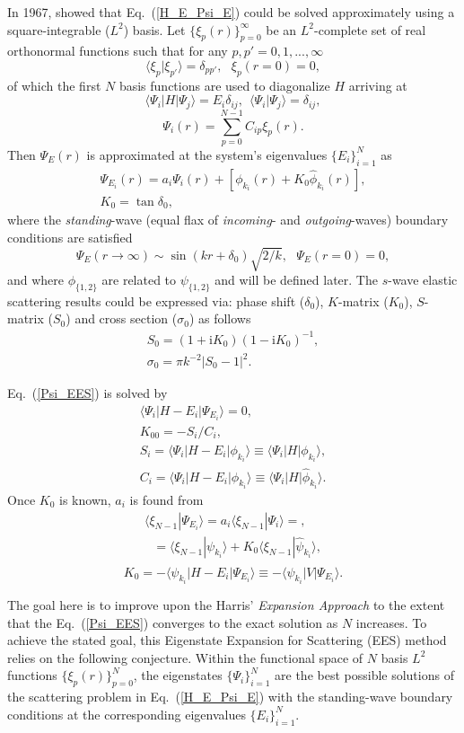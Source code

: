 \documentclass[aip
, pra
, showpacs
, aps
, twocolumn
, groupedaddress
, floatfix
]{revtex4}
\newcommand{\beq}{\begin{equation}}
\newcommand{\eeq}{\end{equation}}
\newcommand{\barr}{\begin{array}}
\newcommand{\earr}{\end{array}}
\begin{document}
In 1967, \citet{Harris67} showed that Eq.~(\ref{H_E_Psi_E}) could be solved
approximately using a square-integrable ($L^2$) basis.
Let $\{\xi_p(r)\}_{p=0}^\infty$ be an $L^2$-complete set of real orthonormal functions
such that for any $p,p'=0,1,...,\infty$
\beq
\langle \xi_p | \xi_{p'} \rangle=\delta_{pp'}, \ \ \ \xi_p(r=0)=0,
\eeq
of which the first $N$ basis functions are used to diagonalize $H$ arriving at
\beq
\langle \Psi_i |H| \Psi_j \rangle = E_i \delta_{ij} , \ \ \langle \Psi_i | \Psi_j \rangle=\delta_{ij},
\eeq
\beq
\Psi_i(r) = \sum_{p=0}^{N-1} C_{ip} \xi_p(r).
\eeq
Then $\Psi_E(r)$ is approximated at the system's eigenvalues $\{E_i\}_{i=1}^{N}$ as
\cite{Harris67}
\beq \barr{l}
\Psi_{E_i}(r) = a_i \Psi_i(r)  + [\phi_{k_i}(r)  + K_0 \widehat{\phi}_{k_i}(r)],\\
K_0 = \tan{\delta_0},
\earr \label{Psi_EES} \eeq
where the {\em standing}-wave (equal flax of {\em incoming}- and {\em outgoing}-waves) boundary conditions are satisfied
\beq
\Psi_E(r \rightarrow \infty) \sim  \sin(kr+\delta_0) \sqrt{2/k}, \ \ \ \Psi_E(r= 0)=0,
\eeq
and where $\phi_{\{1,2\}}$ are related to $\psi_{\{1,2\}}$ and will be defined later.
The $s$-wave elastic scattering results could be expressed via:
phase shift ($\delta_0$), $K$-matrix ($K_0$), $S$-matrix ($S_{0}$) and cross section ($\sigma_{0}$)
as follows
\beq \barr{l}
S_{0}=(1+\mbox{i}K_0)(1-\mbox{i}K_0)^{-1}, \\
\sigma_{0}=\pi k^{-2} |S_{0}-1|^2.
\earr \eeq


Eq.~(\ref{Psi_EES}) is solved by
\beq \barr{l}
\langle\Psi_i|H-E_i|\Psi_{E_i}\rangle=0,\\
K_{00} = - S_i / C_i, \\
S_i = \langle\Psi_i|H-E_i|  \phi_{k_i} \rangle \equiv \langle\Psi_i|H|  \phi_{k_i} \rangle, \\
C_i = \langle\Psi_i|H-E_i|  \widehat{\phi}_{k_i} \rangle \equiv \langle\Psi_i|H|  \widehat{\phi}_{k_i} \rangle.
\earr \eeq
Once $K_0$ is known, $a_i$ is found from
\beq \barr{l}
\langle \xi_{N-1} | \Psi_{E_i}\rangle
= a_i \langle \xi_{N-1}| \Psi_i \rangle = ,\\
\ \ \ =  \langle \xi_{N-1}| \psi_{k_i} \rangle
+ K_0 \langle \xi_{N-1}| \widehat{\psi}_{k_i} \rangle ,\\
\earr \eeq
\beq
K_0 = -\langle \psi_{k_i} | H - E_i | \Psi_{E_i} \rangle \equiv
-\langle \psi_{k_i} | V | \Psi_{E_i} \rangle.
\eeq


The goal here is to improve upon the Harris' {\em Expansion Approach} \cite{Harris67} to the extent that the Eq.~(\ref{Psi_EES})
converges to the exact solution as $N$ increases.
To achieve the stated goal, this Eigenstate Expansion for Scattering (EES) method relies on the following conjecture.
Within the functional space of $N$ basis $L^2$ functions  $\{\xi_p(r)\}_{p=0}^N$,
the eigenstates $\{\Psi_i\}_{i=1}^{N}$ are the best possible solutions of the scattering problem in Eq.~(\ref{H_E_Psi_E})
with the standing-wave boundary conditions at the corresponding eigenvalues $\{E_i\}_{i=1}^{N}$.
\end{document}
